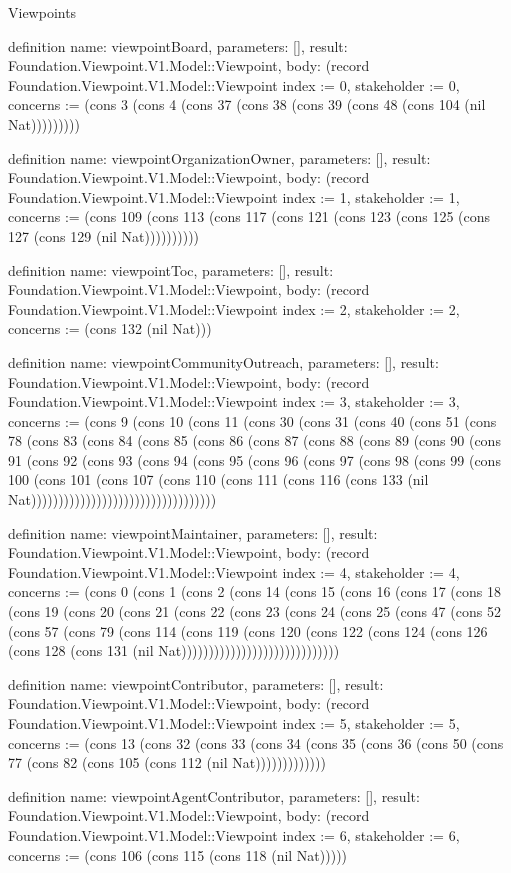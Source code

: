 \begin{lexlean}{Viewpoints}
\begin{semanticmodule}
definition{
  name: viewpointBoard,
  parameters: [],
  result: Foundation.Viewpoint.V1.Model::Viewpoint,
  body: (record Foundation.Viewpoint.V1.Model::Viewpoint {index := 0, stakeholder := 0, concerns := (cons 3 (cons 4 (cons 37 (cons 38 (cons 39 (cons 48 (cons 104 (nil Nat))))))))})
}

definition{
  name: viewpointOrganizationOwner,
  parameters: [],
  result: Foundation.Viewpoint.V1.Model::Viewpoint,
  body: (record Foundation.Viewpoint.V1.Model::Viewpoint {index := 1, stakeholder := 1, concerns := (cons 109 (cons 113 (cons 117 (cons 121 (cons 123 (cons 125 (cons 127 (cons 129 (nil Nat)))))))))})
}

definition{
  name: viewpointToc,
  parameters: [],
  result: Foundation.Viewpoint.V1.Model::Viewpoint,
  body: (record Foundation.Viewpoint.V1.Model::Viewpoint {index := 2, stakeholder := 2, concerns := (cons 132 (nil Nat))})
}

definition{
  name: viewpointCommunityOutreach,
  parameters: [],
  result: Foundation.Viewpoint.V1.Model::Viewpoint,
  body: (record Foundation.Viewpoint.V1.Model::Viewpoint {index := 3, stakeholder := 3, concerns := (cons 9 (cons 10 (cons 11 (cons 30 (cons 31 (cons 40 (cons 51 (cons 78 (cons 83 (cons 84 (cons 85 (cons 86 (cons 87 (cons 88 (cons 89 (cons 90 (cons 91 (cons 92 (cons 93 (cons 94 (cons 95 (cons 96 (cons 97 (cons 98 (cons 99 (cons 100 (cons 101 (cons 107 (cons 110 (cons 111 (cons 116 (cons 133 (nil Nat)))))))))))))))))))))))))))))))))})
}

definition{
  name: viewpointMaintainer,
  parameters: [],
  result: Foundation.Viewpoint.V1.Model::Viewpoint,
  body: (record Foundation.Viewpoint.V1.Model::Viewpoint {index := 4, stakeholder := 4, concerns := (cons 0 (cons 1 (cons 2 (cons 14 (cons 15 (cons 16 (cons 17 (cons 18 (cons 19 (cons 20 (cons 21 (cons 22 (cons 23 (cons 24 (cons 25 (cons 47 (cons 52 (cons 57 (cons 79 (cons 114 (cons 119 (cons 120 (cons 122 (cons 124 (cons 126 (cons 128 (cons 131 (nil Nat))))))))))))))))))))))))))))})
}

definition{
  name: viewpointContributor,
  parameters: [],
  result: Foundation.Viewpoint.V1.Model::Viewpoint,
  body: (record Foundation.Viewpoint.V1.Model::Viewpoint {index := 5, stakeholder := 5, concerns := (cons 13 (cons 32 (cons 33 (cons 34 (cons 35 (cons 36 (cons 50 (cons 77 (cons 82 (cons 105 (cons 112 (nil Nat))))))))))))})
}

definition{
  name: viewpointAgentContributor,
  parameters: [],
  result: Foundation.Viewpoint.V1.Model::Viewpoint,
  body: (record Foundation.Viewpoint.V1.Model::Viewpoint {index := 6, stakeholder := 6, concerns := (cons 106 (cons 115 (cons 118 (nil Nat))))})
}


\end{semanticmodule}
\end{lexlean}
